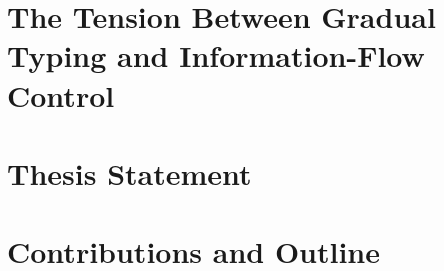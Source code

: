 
\section{The Tension Between Gradual Typing and Information-Flow Control}

\section{Thesis Statement}

\section{Contributions and Outline}
